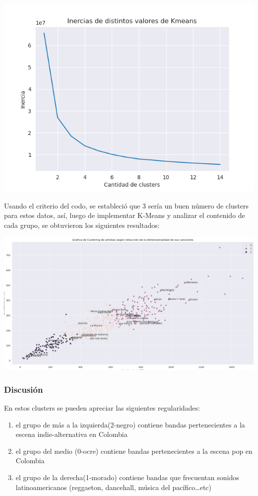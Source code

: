 \documentclass[11pt]{article}
\begin{document}
\begin{center}
\includegraphics[width=.9\linewidth]{./images/inercias1.png}
\end{center}

Usando el criterio del codo, se estableció
que 3 sería un buen número de clusters para estos datos, así, luego de
implementar K-Means y analizar el contenido de cada grupo, se obtuvieron los
siguientes resultados:

\begin{center}
\includegraphics[width=.9\linewidth]{./images/clustering1.png}
\end{center}

\subsubsection{Discusión}
\label{sec:orgf7301cf}
En estos clusters se pueden apreciar las siguientes regularidades:
\begin{enumerate}
\item el grupo de más a la izquierda(2-negro) contiene bandas pertenecientes a la escena indie-alternativa en Colombia
\item el grupo del medio (0-ocre) contiene bandas pertenecientes a la escena pop en Colombia
\item el grupo de la derecha(1-morado) contiene bandas que frecuentan sonidos latinoamericanos (reggaeton, dancehall, música del pacífico\ldots{}etc)
\end{enumerate}
\end{document}
